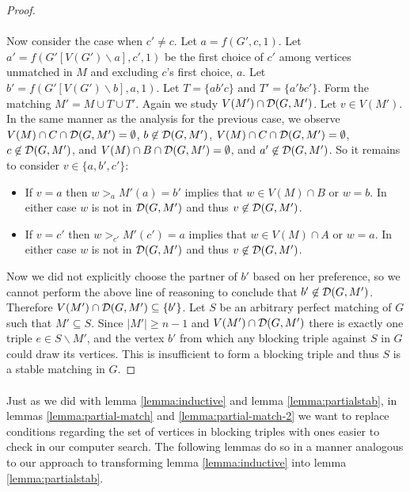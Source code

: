 \begin{proof}
\paragraph{}
Now consider the case when $c' \neq c$. Let $a = f(G',c,1)$. Let $a' = f(G'[V(G')\backslash a], c',1)$ be the first choice of $c'$ among vertices unmatched in $M$ and excluding $c$'s first choice, $a$. Let $b' = f(G'[V(G')\backslash b], a, 1)$. Let $T = \{ab'c\}$ and $T' = \{a'bc'\}$. Form the matching $M' = M \cup T \cup T'$. Again we study $V(M') \cap \mathcal{D}(G,M')$. Let $v \in V(M')$. In the same manner as the analysis for the previous case, we observe $V(M) \cap C \cap \mathcal{D}(G,M') = \emptyset$, $b \not \in \mathcal{D}(G,M')$, $V(M) \cap C \cap \mathcal{D}(G,M') = \emptyset $, $c\not\in \mathcal{D}(G,M')$, and $V(M) \cap B \cap \mathcal{D}(G,M') = \emptyset$, and $a' \not\in \mathcal{D}(G,M')$. So it remains to consider $v \in \{a, b', c'\}$:
\begin{itemize}
\item If $v = a$ then $w>_a M'(a) = b'$ implies that $w \in V(M) \cap B$ or $w = b$. In either case $w$ is not in $\mathcal{D}(G,M')$ and thus $v \not\in \mathcal{D}(G,M')$.
\item If $v = c'$ then $w>_{c'} M'(c') = a$ implies that $w \in V(M) \cap A$ or $w = a$. In either case $w$ is not in $\mathcal{D}(G,M')$ and thus $v \not\in \mathcal{D}(G,M')$.
\end{itemize}
Now we did not explicitly choose the partner of $b'$ based on her preference, so we cannot perform the above line of reasoning to conclude that $b' \not\in \mathcal{D}(G,M')$. Therefore $V(M') \cap \mathcal{D}(G,M') \subseteq \{b'\}$. Let $S$ be an arbitrary perfect matching of $G$ such that $M' \subseteq S$. Since $|M'| \geq n-1$ and $V(M') \cap \mathcal{D}(G,M')$ there is exactly  one triple $e \in S \backslash M'$, and the vertex $b'$ from which any blocking triple against $S$ in $G$ could draw its vertices. This is insufficient to form a blocking triple and thus $S$ is a stable matching in $G$.
\end{proof}

\paragraph{}
Just as we did with lemma \ref{lemma:inductive} and lemma \ref{lemma:partialstab}, in lemmas \ref{lemma:partial-match} and \ref{lemma:partial-match-2} we want to replace conditions regarding the set of vertices in blocking triples with ones easier to check in our computer search. The following lemmas do so in a manner analogous to our approach to transforming lemma \ref{lemma:inductive} into lemma \ref{lemma:partialstab}.

